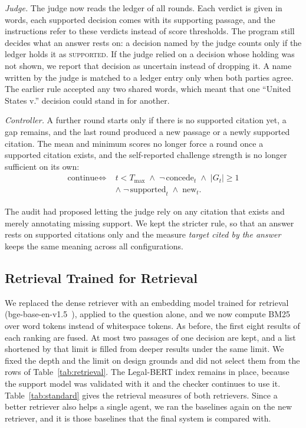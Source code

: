 \documentclass[conference]{IEEEtran}
\begin{document}
\emph{Judge.} The judge now reads the ledger of all rounds. Each verdict is given in words, each supported decision comes with its supporting passage, and the instructions refer to these verdicts instead of score thresholds. The program still decides what an answer rests on: a decision named by the judge counts only if the ledger holds it as \textsc{supported}. If the judge relied on a decision whose holding was not shown, we report that decision as uncertain instead of dropping it. A name written by the judge is matched to a ledger entry only when both parties agree. The earlier rule accepted any two shared words, which meant that one ``United States v.'' decision could stand in for another.

\emph{Controller.} A further round starts only if there is no supported citation yet, a gap remains, and the last round produced a new passage or a newly supported citation. The mean and minimum scores no longer force a round once a supported citation exists, and the self-reported challenge strength is no longer sufficient on its own:
\begin{equation}
\begin{aligned}
\text{continue} \iff\; & t < T_{\max} \;\land\; \lnot\,\mathrm{concede}_t \;\land\; |G_t| \geq 1 \\
& \land\; \lnot\,\mathrm{supported}_t \;\land\; \mathrm{new}_t .
\end{aligned}
\end{equation}

The audit had proposed letting the judge rely on any citation that exists and merely annotating missing support. We kept the stricter rule, so that an answer rests on supported citations only and the measure \emph{target cited by the answer} keeps the same meaning across all configurations.

\subsection{Retrieval Trained for Retrieval}
We replaced the dense retriever with an embedding model trained for retrieval (bge-base-en-v1.5~\cite{bge}), applied to the question alone, and we now compute BM25 over word tokens instead of whitespace tokens. As before, the first eight results of each ranking are fused. At most two passages of one decision are kept, and a list shortened by that limit is filled from deeper results under the same limit. We fixed the depth and the limit on design grounds and did not select them from the rows of Table~\ref{tab:retrieval}. The Legal-BERT index remains in place, because the support model was validated with it and the checker continues to use it. Table~\ref{tab:standard} gives the retrieval measures of both retrievers. Since a better retriever also helps a single agent, we ran the baselines again on the new retriever, and it is those baselines that the final system is compared with.
\end{document}
